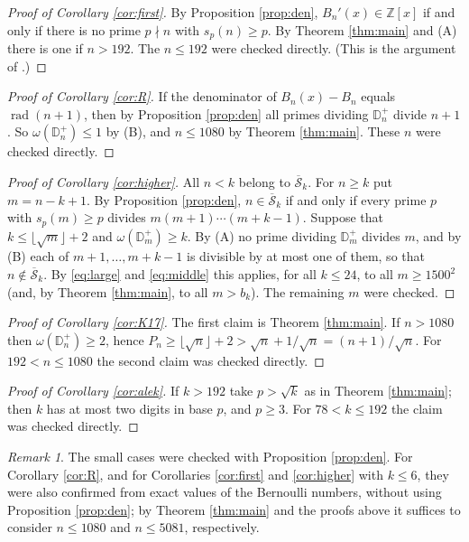 \documentclass[11pt]{amsart}
\theoremstyle{remark}
\newtheorem*{remark}{Remark}
\numberwithin{equation}{section}
\newcommand{\ZZ}{\mathbb Z}
\newcommand{\Dp}{\mathbb D^{+}}
\newcommand{\fl}[1]{\lfloor #1\rfloor}
\newcommand{\Sb}{\overline{\mathcal S}}
\begin{document}
\begin{proof}[Proof of Corollary \ref{cor:first}]
By Proposition \ref{prop:den}, $B_n'(x)\in\ZZ[x]$ if and only if there is no prime $p\nmid n$ with $s_p(n)\ge p$. By
Theorem \ref{thm:main} and (A) there is one if $n>192$. The $n\le192$ were checked directly. (This is the argument of
\cite[Theorem 3]{K24}.)
\end{proof}

\begin{proof}[Proof of Corollary \ref{cor:R}]
If the denominator of $B_n(x)-B_n$ equals $\operatorname{rad}(n+1)$, then by Proposition \ref{prop:den} all primes dividing $\Dp_n$
divide $n+1$. So $\omega(\Dp_n)\le1$ by (B), and $n\le1080$ by Theorem \ref{thm:main}. These $n$ were checked directly.
\end{proof}

\begin{proof}[Proof of Corollary \ref{cor:higher}]
All $n<k$ belong to $\Sb_k$. For $n\ge k$ put $m=n-k+1$. By Proposition \ref{prop:den}, $n\in\Sb_k$ if and only if every prime $p$ with
$s_p(m)\ge p$ divides $m(m+1)\cdots(m+k-1)$.
Suppose that $k\le\fl{\sqrt m}+2$ and $\omega(\Dp_m)\ge k$. By (A) no prime dividing $\Dp_m$ divides $m$, and by (B) each of
$m+1,\dots,m+k-1$ is divisible by at most one of them, so that $n\notin\Sb_k$.
By \eqref{eq:large} and \eqref{eq:middle} this applies, for all $k\le24$, to all $m\ge1500^2$ (and, by
Theorem \ref{thm:main}, to all $m>b_k$). The remaining $m$ were checked.
\end{proof}

\begin{proof}[Proof of Corollary \ref{cor:K17}]
The first claim is Theorem \ref{thm:main}. If $n>1080$ then $\omega(\Dp_n)\ge2$, hence
$P_n\ge\fl{\sqrt n}+2>\sqrt n+1/\sqrt n=(n+1)/\sqrt n$. For $192<n\le1080$ the second claim was checked directly.
\end{proof}

\begin{proof}[Proof of Corollary \ref{cor:alek}]
If $k>192$ take $p>\sqrt k$ as in Theorem \ref{thm:main}; then $k$ has at most two digits in base $p$, and $p\ge3$. For $78<k\le192$
the claim was checked directly.
\end{proof}

\begin{remark}
The small cases were checked with Proposition \ref{prop:den}. For Corollary \ref{cor:R}, and for Corollaries \ref{cor:first}
and \ref{cor:higher} with $k\le6$, they were also confirmed from exact values of the Bernoulli numbers, without using
Proposition \ref{prop:den}; by Theorem \ref{thm:main} and the proofs above it suffices to consider $n\le1080$ and $n\le5081$,
respectively.
\end{remark}
\end{document}
